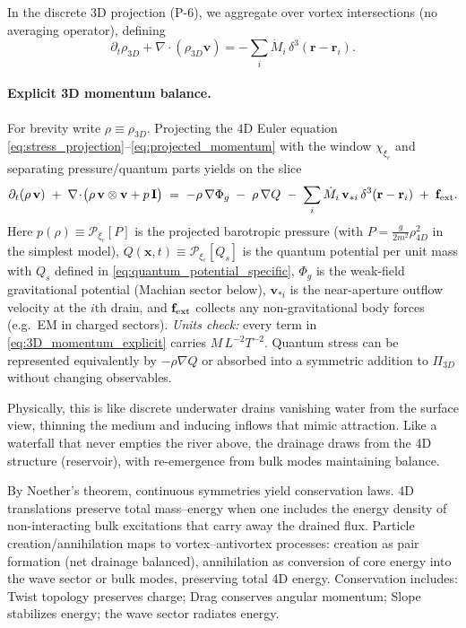 In the discrete 3D projection (P-6), we aggregate over vortex intersections (no averaging operator), defining
\begin{equation}
\partial_t \rho_{3D} + \nabla \!\cdot (\rho_{3D}\mathbf{v}) = -\sum_i \dot{M}_i\,\delta^3(\mathbf{r}-\mathbf{r}_i).
\end{equation}

\paragraph{Explicit 3D momentum balance.}
For brevity write $\rho\equiv\rho_{3D}$. Projecting the $4$D Euler equation \eqref{eq:stress_projection}–\eqref{eq:projected_momentum} with the window $\chi_{\xi_c}$ and separating pressure/quantum parts yields on the slice
\begin{equation}
\partial_t(\rho\,\mathbf v)\;+\;\nabla\!\cdot\!\big(\rho\,\mathbf v\otimes\mathbf v + p\,\mathbf I\big)
\;=\;-\rho\,\nabla\Phi_g\;-\;\rho\,\nabla Q\;-\;\sum_i \dot M_i\,\mathbf v_{*i}\,\delta^{3}(\mathbf r-\mathbf r_i)\;+\;\mathbf f_{\rm ext}.
\label{eq:3D_momentum_explicit}
\end{equation}
Here $p(\rho)\equiv \mathcal{P}_{\xi_c}[P]$ is the projected barotropic pressure (with $P=\tfrac{g}{2m^2}\rho_{4D}^2$ in the simplest model), $Q(\mathbf x,t)\equiv \mathcal{P}_{\xi_c}[Q_s]$ is the quantum potential per unit mass with $Q_s$ defined in \eqref{eq:quantum_potential_specific}, $\Phi_g$ is the weak-field gravitational potential (Machian sector below), $\mathbf v_{*i}$ is the near-aperture outflow velocity at the $i$th drain, and $\mathbf f_{\rm ext}$ collects any non-gravitational body forces (e.g.\ EM in charged sectors).
\emph{Units check:} every term in \eqref{eq:3D_momentum_explicit} carries $M\,L^{-2}T^{-2}$. Quantum stress can be represented equivalently by $-\rho\nabla Q$ or absorbed into a symmetric addition to $\Pi_{3D}$ without changing observables.

Physically, this is like discrete underwater drains vanishing water from the surface view, thinning the medium and inducing inflows that mimic attraction. Like a waterfall that never empties the river above, the drainage draws from the 4D structure (reservoir), with re-emergence from bulk modes maintaining balance.

By Noether's theorem, continuous symmetries yield conservation laws. 4D translations preserve total mass–energy when one includes the energy density of non-interacting bulk excitations that carry away the drained flux. Particle creation/annihilation maps to vortex–antivortex processes: creation as pair formation (net drainage balanced), annihilation as conversion of core energy into the wave sector or bulk modes, preserving total 4D energy. Conservation includes: Twist topology preserves charge; Drag conserves angular momentum; Slope stabilizes energy; the wave sector radiates energy.

